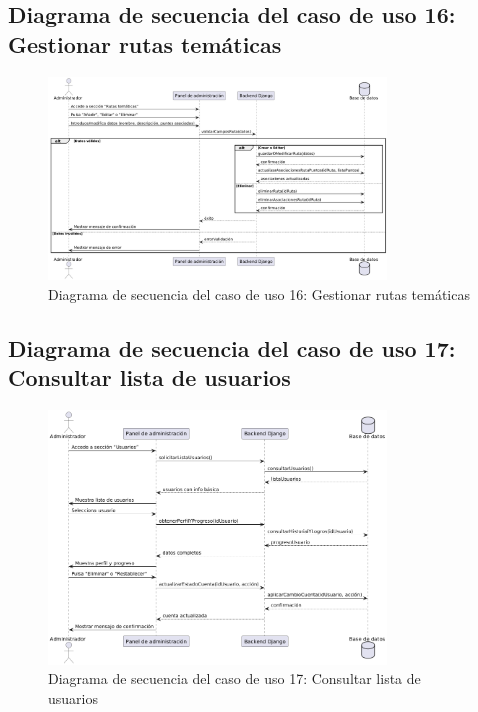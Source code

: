 \subsection{Diagrama de secuencia del caso de uso 16: Gestionar rutas temáticas}
\begin{figure}[H]
    \centering
    \includegraphics[width=0.8\textwidth]{figs/caso16.png}
    \caption{Diagrama de secuencia del caso de uso 16: Gestionar rutas temáticas}
\end{figure}

\subsection{Diagrama de secuencia del caso de uso 17: Consultar lista de usuarios}
\begin{figure}[H]
    \centering
    \includegraphics[width=0.8\textwidth]{figs/caso17.png}
    \caption{Diagrama de secuencia del caso de uso 17: Consultar lista de usuarios}
\end{figure}

